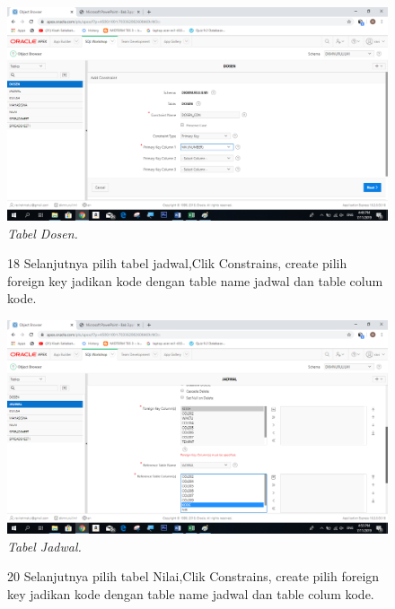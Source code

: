 \begin{enumerate}
\begin{figure}
    \begin{center}
    \includegraphics[scale=0.6]{figures/19.png}
    \caption{\textit{Tabel Dosen.}}
    \end{center}
    \label{gambar}
    \end{figure}

\begin{figure}
\item[18]Selanjutnya pilih tabel jadwal,Clik Constrains, create pilih foreign key jadikan kode dengan table name jadwal dan table colum kode.

    \begin{center}
    \includegraphics[scale=0.6]{figures/21.png}
    \caption{\textit{Tabel Jadwal.}}
    \end{center}
    \label{gambar}
    \end{figure}

\begin{figure}
\item[20] Selanjutnya pilih tabel Nilai,Clik Constrains, create pilih foreign key jadikan kode dengan table name jadwal dan table colum kode.


\end{figure}
\end{enumerate}
